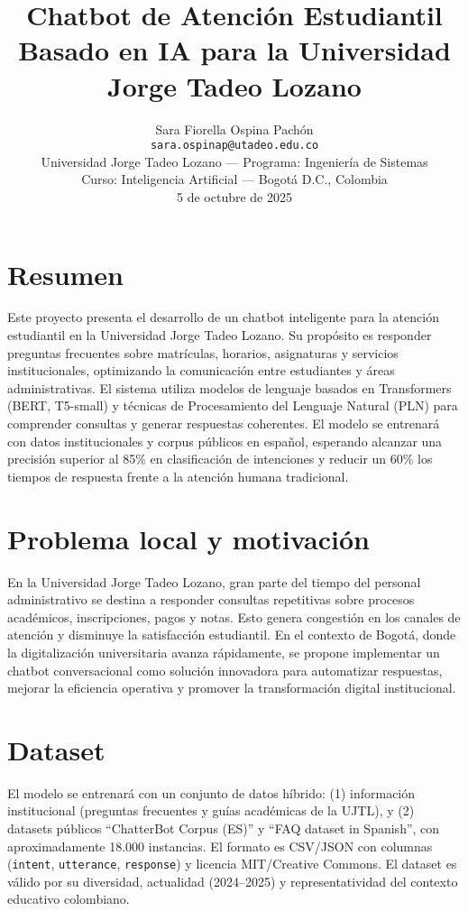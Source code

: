 \documentclass[11pt,letterpaper]{article}
\title{\textbf{Chatbot de Atención Estudiantil Basado en IA para la Universidad Jorge Tadeo Lozano}}
\author{
Sara Fiorella Ospina Pachón \\ 
\texttt{sara.ospinap@utadeo.edu.co} \\
Universidad Jorge Tadeo Lozano — Programa: Ingeniería de Sistemas \\
Curso: Inteligencia Artificial — Bogotá D.C., Colombia \\
5 de octubre de 2025
}
\date{}
\begin{document}
\maketitle

\section*{Resumen}
Este proyecto presenta el desarrollo de un chatbot inteligente para la atención estudiantil en la Universidad Jorge Tadeo Lozano. Su propósito es responder preguntas frecuentes sobre matrículas, horarios, asignaturas y servicios institucionales, optimizando la comunicación entre estudiantes y áreas administrativas. El sistema utiliza modelos de lenguaje basados en Transformers (BERT, T5-small) y técnicas de Procesamiento del Lenguaje Natural (PLN) para comprender consultas y generar respuestas coherentes. El modelo se entrenará con datos institucionales y corpus públicos en español, esperando alcanzar una precisión superior al 85\% en clasificación de intenciones y reducir un 60\% los tiempos de respuesta frente a la atención humana tradicional.

\section*{Problema local y motivación}
En la Universidad Jorge Tadeo Lozano, gran parte del tiempo del personal administrativo se destina a responder consultas repetitivas sobre procesos académicos, inscripciones, pagos y notas. Esto genera congestión en los canales de atención y disminuye la satisfacción estudiantil. En el contexto de Bogotá, donde la digitalización universitaria avanza rápidamente, se propone implementar un chatbot conversacional como solución innovadora para automatizar respuestas, mejorar la eficiencia operativa y promover la transformación digital institucional.

\section*{Dataset}
El modelo se entrenará con un conjunto de datos híbrido: (1) información institucional (preguntas frecuentes y guías académicas de la UJTL), y (2) datasets públicos “ChatterBot Corpus (ES)” y “FAQ dataset in Spanish”, con aproximadamente 18.000 instancias. El formato es CSV/JSON con columnas (\texttt{intent}, \texttt{utterance}, \texttt{response}) y licencia MIT/Creative Commons. El dataset es válido por su diversidad, actualidad (2024–2025) y representatividad del contexto educativo colombiano.
\end{document}

